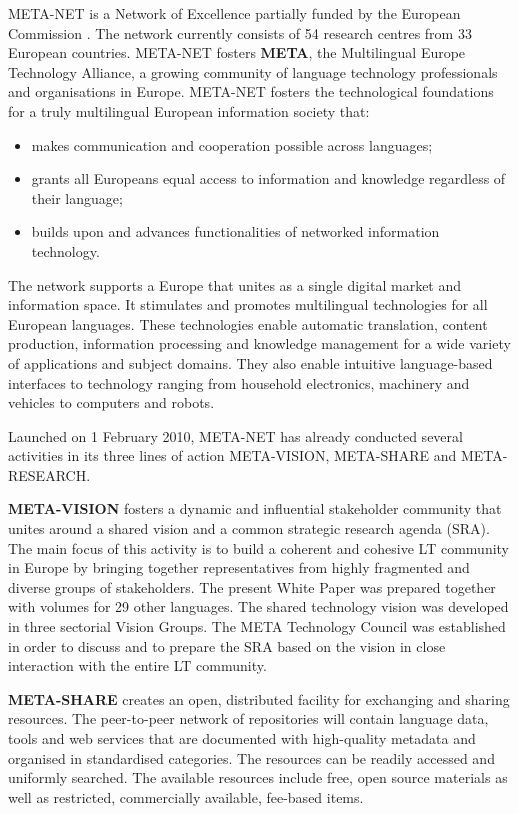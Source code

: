 \begin{multicols}{2}
META-NET is a Network of Excellence partially funded by the European Commission \cite{rehm2011}. The network currently consists of 54 research centres from 33 European countries. META-NET fosters \textbf{META}, the Multilingual Europe Technology Alliance, a growing community of language technology professionals and organisations in Europe.  META-NET fosters the technological foundations for a truly multilingual European information society that:

\begin{itemize}
\item makes communication and cooperation possible across languages;
\item grants all Europeans equal access  to information and knowledge regardless of their language;
\item builds upon and advances functionalities of networked information technology.
\end{itemize}

The network supports a Europe  that unites as a single digital market and information space. It stimulates and promotes multilingual technologies for all European languages. These technologies enable automatic translation, content production, information processing and knowledge management for a wide variety of applications and subject domains. They also enable intuitive language-based interfaces to technology ranging from household electronics, machinery and vehicles to computers and robots.

Launched on 1 February 2010,   META-NET has already conducted several activities in its three lines of action META-VISION, META-SHARE and META-RESEARCH.

\textbf{META-VISION} fosters a dynamic and influential stakeholder community that unites around a shared vision and a common strategic research agenda (SRA). The main focus of this activity is to build a coherent and cohesive LT community in Europe by bringing together representatives from highly fragmented and diverse groups of stakeholders. The present White Paper was prepared together with volumes for 29 other languages. The shared technology vision was developed in three sectorial Vision Groups. The META Technology Council was established in order to discuss and to prepare the SRA based on the vision in close interaction with the entire LT community.

\textbf{META-SHARE} creates an open, distributed facility for exchanging and sharing resources. The peer-to-peer network of repositories will contain language data, tools and web services that are documented with high-quality metadata and organised in standardised categories. The resources can be readily accessed and uniformly searched. The available resources include free, open source materials as well as restricted, commercially available, fee-based items.


\end{multicols}
